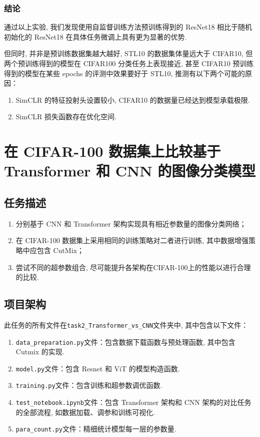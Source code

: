 \documentclass[notitlepage,cs4size,punct,oneside]{ctexrep}
\numberwithin{equation}{chapter}
\theoremstyle{mystyle}
\begin{document}
\subsection{结论}

通过以上实验, 我们发现使用自监督训练方法预训练得到的 ResNet18 相比于随机初始化的 ResNet18 在具体任务微调上具有更为显著的优势.

但同时, 并非是预训练数据集越大越好, STL10 的数据集体量远大于 CIFAR10, 但两个预训练得到的模型在 CIFAR100 分类任务上表现接近, 甚至 CIFAR10 预训练得到的模型在某些 epochs 的评测中效果要好于 STL10, 推测有以下两个可能的原因：

\begin{enumerate}
    \item SimCLR 的特征投射头设置较小, CIFAR10 的数据量已经达到模型承载极限.
    \item SimCLR 损失函数存在优化空间.
\end{enumerate}

\chapter{在 CIFAR-100 数据集上比较基于 Transformer 和 CNN 的图像分类模型}
\section{任务描述}
\begin{enumerate}
\item 分别基于 CNN 和 Transformer 架构实现具有相近参数量的图像分类网络；
\item 在 CIFAR-100 数据集上采用相同的训练策略对二者进行训练, 其中数据增强策略中应包含 CutMix；
\item 尝试不同的超参数组合, 尽可能提升各架构在CIFAR-100上的性能以进行合理的比较.
\end{enumerate}

\section{项目架构}
此任务的所有文件在\texttt{task2\_Transformer\_vs\_CNN}文件夹中, 其中包含以下文件：
\begin{enumerate}
\item \texttt{data\_preparation.py}文件：包含数据下载函数与预处理函数, 其中包含 Cutmix 的实现.
\item \texttt{model.py}文件：包含 Resnet 和 ViT 的模型构造函数.
\item \texttt{training.py}文件：包含训练和超参数调优函数.
\item \texttt{test\_notebook.ipynb}文件：包含 Transformer 架构和 CNN 架构的对比任务的全部流程, 如数据加载、调参和训练可视化.
\item \texttt{para\_count.py}文件：精细统计模型每一层的参数量.
\end{enumerate}
\end{document}
